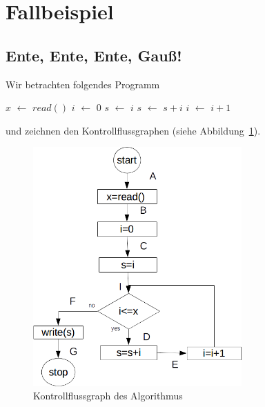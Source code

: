 \documentclass[hidelinks]{article}
\newcommand\Let[2]{\State #1 $\gets$ #2}
\theoremstyle{plain}
\theoremstyle{definition}
\theoremstyle{rem}
\begin{document}
\begin{sloppypar}
\section{Fallbeispiel}
\subsection{Ente, Ente, Ente, Gauß!}
Wir betrachten folgendes Programm
\begin{algorithm}[H]
    \begin{algorithmic}[1]
	\Let{$x$}{$read()$}
	\Let{$i$}{$0$}
	\Let{$s$}{$i$}
		\Let{$s$}{$s+i$}
		\Let{$i$}{$i+1$}
	\EndWhile
	\State {}
  \end{algorithmic}
\end{algorithm}
und zeichnen den Kontrollflussgraphen (siehe Abbildung~\ref{gauss_contr_flow}).
\begin{figure}[ht]
	\includegraphics[width=8cm]{gauss_sum.png}
	\centering
	\caption{Kontrollflussgraph des Algorithmus}
	\label{gauss_contr_flow}
\end{figure}

\end{sloppypar}
\end{document}
